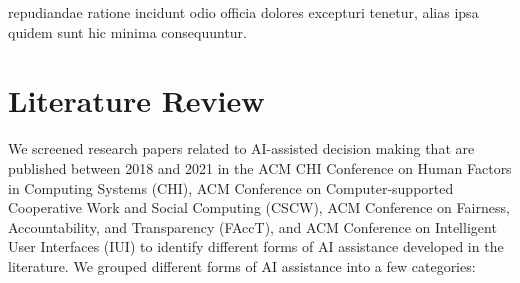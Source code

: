 \documentclass[letterpaper]{article} %
\begin{document}
repudiandae ratione incidunt odio officia dolores excepturi tenetur, alias ipsa quidem sunt hic minima consequuntur.\clearpage


\appendix
\section{Literature Review}
We screened research papers related to AI-assisted decision making that are published between 2018 and 2021 in the ACM CHI Conference on Human Factors in Computing Systems (CHI), ACM Conference on Computer-supported Cooperative Work and
Social Computing (CSCW), ACM Conference on Fairness, Accountability, and Transparency (FAccT), and ACM Conference on Intelligent User Interfaces (IUI) to identify different forms of AI assistance developed in the literature. We grouped different forms of AI assistance into a few categories:
\end{document}
